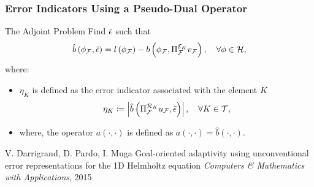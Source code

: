 \begin{frame}
\frametitle{Error Indicators Using a Pseudo-Dual Operator}
    \begin{block}{The Adjoint Problem}
        Find $\tilde{\epsilon}$ such that
      \begin{equation}
         \hat{b}\left(\phi_{\mathcal{F}},\tilde{\epsilon}\right)=l\left(\phi_{\mathcal{F}}\right) - b\left(\phi_{\mathcal{F}},\Pi_{\mathcal{F}}^{\mathcal{E}_K} v_{\mathcal{F}}\right), \quad \forall \phi \in \mathcal{H},
        \label{eq:forward_e}
      \end{equation}
        where:
        \begin{itemize}
            \item $\eta_K$ is defined as the error indicator associated with the element $K$
             \begin{equation}
        		\eta_K \coloneqq \left|\hat{b}\left(\Pi_{\mathcal{F}}^{\mathcal{R}_K} u_{\mathcal{F}}, \tilde{\epsilon}\right)\right|, \quad \forall K \in \mathcal{T},
       		\label{eq:1DGOAupperbound}
     	   \end{equation}
            \item where, the operator $a\left(\cdot ,\cdot\right)$ is defined as $a\left(\cdot ,\cdot\right) = \hat{b}\left(\cdot ,\cdot\right)$.
        \end{itemize}
    \end{block}     
    \begin{thebibliography}{}
    \beamertemplatearticlebibitems
		V. Darrigrand, D. Pardo, I. Muga
		\newblock Goal-oriented adaptivity using unconventional error representations for the 1D Helmholtz equation
		\newblock \emph{Computers \& Mathematics with Applications}, 2015
    \end{thebibliography}
\end{frame}